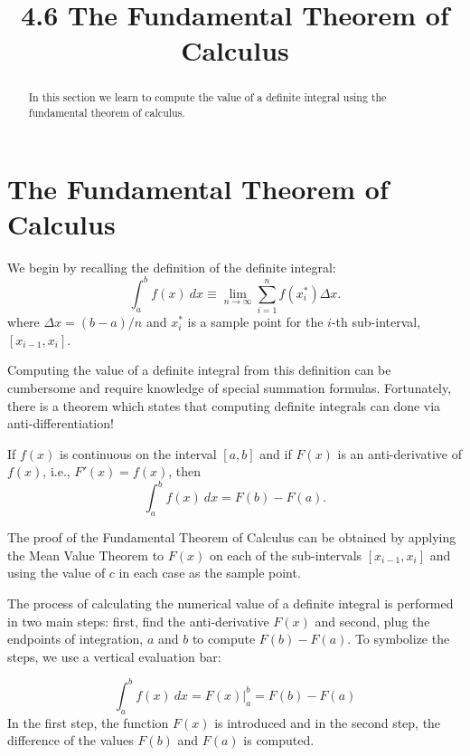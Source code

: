 \documentclass{ximera}
\title{4.6 The Fundamental Theorem of Calculus}
\begin{document}
\begin{abstract}
In this section we learn to compute the value of a definite integral using the fundamental theorem of calculus.
\end{abstract}

\maketitle



\section{The Fundamental Theorem of Calculus}

We begin by recalling the definition of the definite integral:
\[
\int_a^b f(x) \ dx \equiv \lim_{n\to \infty} \sum_{i=1}^n f(x_i^*)\Delta x.
\]
where $\Delta x = (b-a)/n$ and $x_i^*$ is a sample point for the $i$-th sub-interval, $[x_{i-1}, x_i]$.


Computing the value of a definite integral from this definition can be cumbersome and 
require knowledge of special summation formulas.  Fortunately, there is a theorem which states 
that computing definite integrals can done via anti-differentiation!


\begin{theorem}
If $f(x)$ is continuous on the interval $[a, b]$ and if $F(x)$ is an 
anti-derivative of $f(x)$, i.e., $F'(x) = f(x)$, then
\[
\int_a^b f(x) \ dx = F(b) - F(a).
\]
\end{theorem}


The proof of the Fundamental Theorem of Calculus can be obtained by applying the Mean Value Theorem to $F(x)$ on each of the sub-intervals $[x_{i-1}, x_i]$
and using the value of $c$ in each case as the sample point.


The process of calculating the numerical value of a definite integral is performed in 
two main steps: first, find the anti-derivative
$F(x)$ and  second, plug the endpoints of integration, $a$ and $b$ to compute $F(b) - F(a)$. 
To symbolize the steps, we use a vertical evaluation bar:

\[\int_a^b f(x) \ dx = F(x)\Big|_a^b = F(b) - F(a)\]
In the first step, the function $F(x)$ is introduced and in the second step, the difference of the values $F(b)$ and $F(a)$ is computed.
\end{document}
